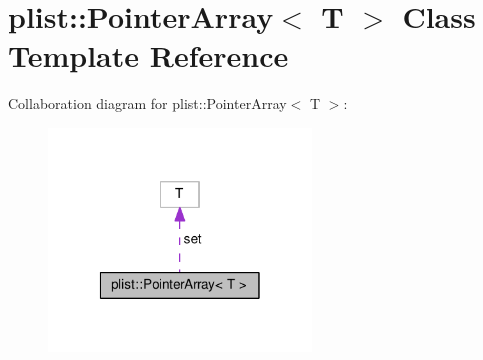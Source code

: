 \hypertarget{classplist_1_1PointerArray}{\section{plist\-:\-:Pointer\-Array$<$ T $>$ Class Template Reference}
\label{classplist_1_1PointerArray}
}


Collaboration diagram for plist\-:\-:Pointer\-Array$<$ T $>$\-:\nopagebreak
\begin{figure}[H]
\begin{center}
\leavevmode
\includegraphics[width=198pt]{classplist_1_1PointerArray__coll__graph}
\end{center}
\end{figure}
